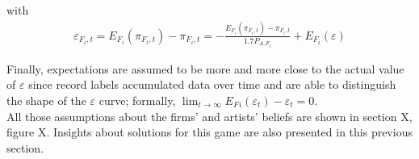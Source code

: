 \documentclass[a4paper,12pt]{article}
\numberwithin{equation}{section}
\begin{document}
with
\begin{eqnarray*}
\varepsilon_{F_{i},t}=E_{F_{i}}(\pi_{F_{i},t})-\pi_{F_{i},t}=-\frac{E_{F_{i}}(\pi_{F_{i},t})-\pi_{F_{i},t}}{1.7P_{A,F_{i}}}+E_{F_{i}}(\varepsilon)
\end{eqnarray*}

Finally, expectations are assumed to be more and more close to
the actual value of $\varepsilon$ since record labels accumulated
data over time and are able to distinguish the shape of the $\varepsilon$
curve; formally, $\lim_{t\rightarrow\infty}E_{F}{}_{i}(\varepsilon_{t})-\varepsilon_{t}=0$.\\

All those assumptions about the firms' and artists' beliefs are shown
in section X, figure X. Insights about solutions for this game are
also presented in this previous section.
\end{document}
